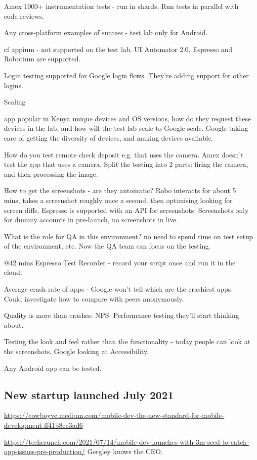 Amex 1000+ instrumentation tests - run in shards. Run tests in parallel with code reviews. 

Any cross-platform examples of success - test lab only for Android. 

cf appium - not supported on the test lab. UI Automator 2.0, Espresso and Robotium are supported.

Login testing supported for Google login flows. They’re adding support for other logins.

Scaling

app popular in Kenya unique devices and OS versions, how do they request these devices in the lab, and how will the test lab scale to Google scale. Google taking care of getting the diversity of devices, and making devices available. 

How do you test remote check deposit e.g. that uses the camera. Amex doesn’t test the app that uses a camera. Split the testing into 2 parts: firing the camera, and then processing the image.

How to get the screenshots - are they automatic? Robo interacts for about 5 mins, takes a screenshot roughly once a second. then optimising looking for screen diffs. Espresso is supported with an API for screenshots. Screenshots only for dummy accounts in pre-launch, no screenshots in live.

What is the role for QA in this environment? no need to spend time on test setup of the environment, etc. Now the QA team can focus on the testing. 

@42 mins Espresso Test Recorder - record your script once and run it in the cloud.


Average crash rate of apps - Google won’t tell which are the crashiest apps. Could investigate how to compare with peers anonymously. 

Quality is more than crashes: NPS. Performance testing they’ll start thinking about. 

Testing the look and feel rather than the functionality - today people can look at the screenshots, Google looking at Accessibility. 

Any Android app can be tested. 


\subsection{New startup launched July 2021}
\url{https://cowboyvc.medium.com/mobile-dev-the-new-standard-for-mobile-development-ff41b8ec3ad6}

\url{https://techcrunch.com/2021/07/14/mobile-dev-launches-with-3m-seed-to-catch-app-issues-pre-production/}
 Gergley knows the CEO.